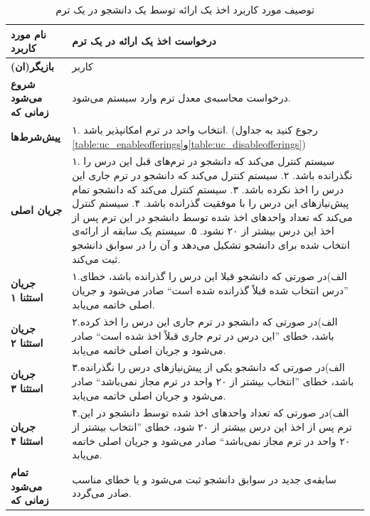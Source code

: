 \begin{table}
\begin{center}
\begin{tabular}{|p{4cm}|p{12cm}|}
	\hline
	\textbf{نام مورد کاربرد} &
درخواست اخذ یک ارائه در یک ترم\\
	\hline
	\textbf{بازیگر(ان)} &
کاربر\\
	\hline
	\textbf{شروع می‌شود زمانی که} &
درخواست محاسبه‌ی معدل ترم وارد سیستم می‌شود.\\
	\hline
	\textbf{پیش‌شرط‌ها} &
۱. ‌انتخاب واحد در ترم امکانپذیر باشد. (رجوع کنید به جداول \ref{table:uc_enableofferings}و\ref{table:uc_disableofferings})\\
	\hline
	\textbf{جریان اصلی} &
۱. سیستم کنترل می‌کند که دانشجو در ترم‌های قبل این درس را نگذرانده باشد.\newline
۲. سیستم کنترل می‌کند که دانشجو در ترم‌ جاری این درس را اخذ نکرده باشد.\newline
۳. سیستم کنترل می‌کند که دانشجو تمام پیش‌نیاز‌های این درس را با موفقیت گذرانده باشد.\newline
۴. سیستم کنترل می‌کند که تعداد واحد‌های اخذ شده توسط دانشجو در این ترم پس از اخذ این درس بیشتر از ۲۰ نشود.\newline
۵. سیستم یک سابقه از ارائه‌ی انتخاب شده برای دانشجو تشکیل می‌دهد و آن را در سوابق دانشجو ثبت می‌کند.\\
	\hline
\textbf{جریان استثنا ۱} &
۱.الف)در صورتی که دانشجو قبلا این درس را گذرانده باشد، خطای ''درس انتخاب شده قبلاً گذرانده شده است`` صادر می‌شود و جریان اصلی خاتمه می‌یابد.\\
	\hline
\textbf{جریان استثنا ۲} &
۲.الف)در صورتی که دانشجو در ترم جاری این درس را اخذ کرده باشد، خطای ''این درس در ترم جاری قبلاً اخذ شده است`` صادر می‌شود و جریان اصلی خاتمه می‌یابد.\\
	\hline
\textbf{جریان استثنا ۳} &
۳.الف)در صورتی که دانشجو یکی از پیش‌نیاز‌های درس‌ را نگذرانده باشد، خطای ''انتخاب بیشتر از ۲۰ واحد در ترم مجاز نمی‌باشد`` صادر می‌شود و جریان اصلی خاتمه می‌یابد.\\
	\hline
\textbf{جریان استثنا ۴} &
۴.الف)در صورتی که تعداد واحد‌های اخذ شده توسط دانشجو در این ترم پس از اخذ این درس بیشتر از ۲۰ شود، خطای ''انتخاب بیشتر از ۲۰ واحد در ترم مجاز نمی‌باشد`` صادر می‌شود و جریان اصلی خاتمه می‌یابد.\\
	\hline
	\textbf{تمام می‌شود زمانی که} &
سابقه‌ی جدید در سوابق دانشجو ثبت می‌شود و یا خطای مناسب صادر می‌گردد.\\
	\hline
\end{tabular}
\caption{\label{table:uc_takecoure} توصیف مورد کاربرد اخذ یک ارائه توسط یک دانشجو در یک ترم}
\end{center}
\end{table}

